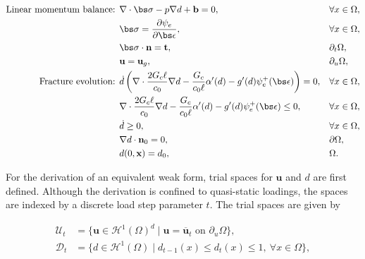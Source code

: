 \begin{mdframed}[
  frametitle={Strong form},
  frametitlebackgroundcolor=gray!20,
  backgroundcolor=gray!5,
  linewidth=0pt,
  nobreak=true
  ]
  \vspace{-1em}
  \begin{align}
    \text{Linear momentum balance: } & \nabla \cdot \bs\sigma -p\nabla d + \textbf{b} = 0,                       &  & \forall x \in \Omega,                          \\
                                     & \bs\sigma = \frac{\partial\psi_e}{\partial \bs\epsilon},                   &  & \forall x \in \Omega, \\
                                     & \bs\sigma\cdot \textbf{n} = \textbf{t},                                          &  & \partial_t\Omega,  
                                     \\
                                     & \textbf{u} = \textbf{u}_g,                                                      &  & \partial_u\Omega ,                \\
    \text{Fracture evolution: }      & \dot d\left(\nabla\cdot\frac{2G_c\ell}{c_0}\nabla d - \frac{G_c}{c_0\ell}\alpha'(d) - g'(d)\psi_e^+ (\bs\epsilon)\right) = 0,                                       &  & \forall x \in \Omega,           \\
    & \nabla \cdot \frac{2G_c\ell}{c_0}\nabla d - \frac{G_c}{c_0\ell}\alpha'(d) - g'(d)\psi_e^+ (\bs\epsilon) \le 0,                                       &  & \forall x \in \Omega,  \label{damage ineq}         \\
                                     & \dot d \ge  0,                                         &  & \forall x \in \Omega, \\
                                     & \nabla d\cdot\textbf{n}_0 = 0,                                         &  & \partial\Omega, \\
                                         & d(0,\textbf{x}) = d_0,                                         &  & \Omega.                                  
    \end{align}
\end{mdframed}

For the derivation of an equivalent weak form, trial spaces for $\textbf{u}$ and $d$ are first defined.  Although the derivation is confined to quasi-static loadings, the spaces are indexed by a discrete load step parameter $t$.   The trial spaces are given by

  \begin{align}
    \boldsymbol{\mathcal{U}}_t & = \{ \textbf{u} \in \mathcal{H}^1(\Omega)^d \mid \textbf{u} = \overline{\textbf{u}}_t \text{ on } \partial_u\Omega \}, \\
    \mathcal{D}_t      & = \{ d \in \mathcal{H}^1(\Omega) \mid d_{t-1}(x) \le d_t(x) \le 1,\ \forall x \in \Omega \}, 
  \end{align}

